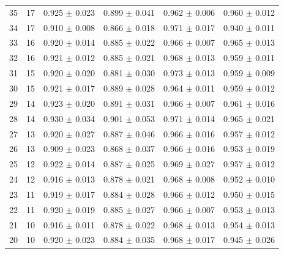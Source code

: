 \begin{table}[H]
\begin{tabular}{c c c c c c}
       35 & 17 & 0.925 $\pm$ 0.023 & 0.899 $\pm$ 0.041 & 0.962 $\pm$ 0.006 & 0.960 $\pm$ 0.012\\ 
       34 & 17 & 0.910 $\pm$ 0.008 & 0.866 $\pm$ 0.018 & 0.971 $\pm$ 0.017 & 0.940 $\pm$ 0.011\\ 
       33 & 16 & 0.920 $\pm$ 0.014 & 0.885 $\pm$ 0.022 & 0.966 $\pm$ 0.007 & 0.965 $\pm$ 0.013\\ 
       32 & 16 & 0.921 $\pm$ 0.012 & 0.885 $\pm$ 0.021 & 0.968 $\pm$ 0.013 & 0.959 $\pm$ 0.011\\ 
       31 & 15 & 0.920 $\pm$ 0.020 & 0.881 $\pm$ 0.030 & 0.973 $\pm$ 0.013 & 0.959 $\pm$ 0.009\\ 
       30 & 15 & 0.921 $\pm$ 0.017 & 0.889 $\pm$ 0.028 & 0.964 $\pm$ 0.011 & 0.959 $\pm$ 0.012\\ 
       29 & 14 & 0.923 $\pm$ 0.020 & 0.891 $\pm$ 0.031 & 0.966 $\pm$ 0.007 & 0.961 $\pm$ 0.016\\ 
       28 & 14 & 0.930 $\pm$ 0.034 & 0.901 $\pm$ 0.053 & 0.971 $\pm$ 0.014 & 0.965 $\pm$ 0.021\\ 
       27 & 13 & 0.920 $\pm$ 0.027 & 0.887 $\pm$ 0.046 & 0.966 $\pm$ 0.016 & 0.957 $\pm$ 0.012\\ 
       26 & 13 & 0.909 $\pm$ 0.023 & 0.868 $\pm$ 0.037 & 0.966 $\pm$ 0.016 & 0.953 $\pm$ 0.019\\ 
       25 & 12 & 0.922 $\pm$ 0.014 & 0.887 $\pm$ 0.025 & 0.969 $\pm$ 0.027 & 0.957 $\pm$ 0.012\\ 
       24 & 12 & 0.916 $\pm$ 0.013 & 0.878 $\pm$ 0.021 & 0.968 $\pm$ 0.008 & 0.952 $\pm$ 0.010\\ 
       23 & 11 & 0.919 $\pm$ 0.017 & 0.884 $\pm$ 0.028 & 0.966 $\pm$ 0.012 & 0.950 $\pm$ 0.015\\ 
       22 & 11 & 0.920 $\pm$ 0.019 & 0.885 $\pm$ 0.027 & 0.966 $\pm$ 0.007 & 0.953 $\pm$ 0.013\\ 
       21 & 10 & 0.916 $\pm$ 0.011 & 0.878 $\pm$ 0.022 & 0.968 $\pm$ 0.013 & 0.954 $\pm$ 0.013\\ 
       20 & 10 & 0.920 $\pm$ 0.023 & 0.884 $\pm$ 0.035 & 0.968 $\pm$ 0.017 & 0.945 $\pm$ 0.026\\
      
		\bottomrule
		\hline
	\end{tabular}
	\label{tab:tablamodelos_2layers}
\end{table}


